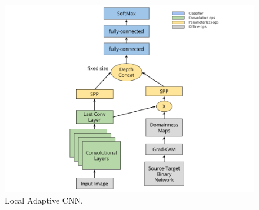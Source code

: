 \documentclass[../main.tex]{subfiles}
\begin{document}
    \begin{figure}[h!]
        \centering{}
        \includegraphics[width=\linewidth]{./img/load-architecture.png}
        \caption{Local Adaptive CNN.}\label{fig:load-architecture}
    \end{figure}
\end{document}
